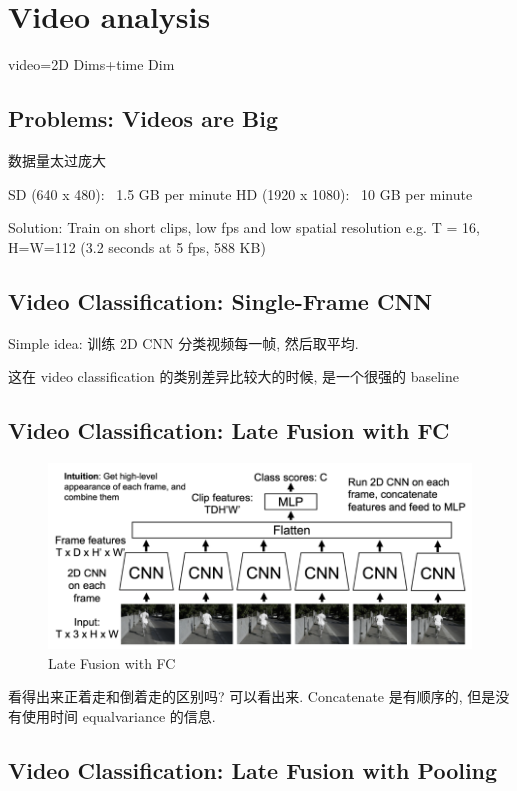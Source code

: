 \chapter{Video analysis}

video=2D Dims+time Dim

\section{Problems: Videos are Big}

数据量太过庞大

SD (640 x 480): ~1.5 GB per minute
HD (1920 x 1080): ~10 GB per minute

Solution: Train on short clips, low fps and low spatial resolution
e.g. T = 16, H=W=112 (3.2 seconds at 5 fps, 588 KB)

\section{Video Classification: Single-Frame CNN}

Simple idea: 训练 2D CNN 分类视频每一帧, 然后取平均.

这在 video classification 的类别差异比较大的时候, 是一个很强的 baseline

\section{Video Classification: Late Fusion with FC}

\begin{figure}[htbp]
    \centering
    \includegraphics[scale=0.25]{figures/LF_FC.png}
    \caption{Late Fusion with FC}
\end{figure}

看得出来正着走和倒着走的区别吗? 可以看出来. Concatenate 是有顺序的, 但是没有使用时间 equalvariance 的信息.

\section{Video Classification: Late Fusion with Pooling}

